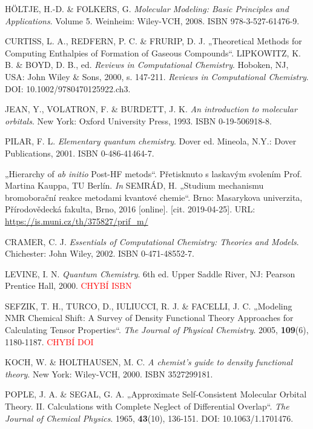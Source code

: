 \begin{thebibliography}{10}
HÖLTJE, H.-D. \& FOLKERS, G. \textit{Molecular Modeling: Basic Principles and Applications}. Volume 5. Weinheim: Wiley-VCH, 2008. ISBN 978-3-527-61476-9.

CURTISS, L. A., REDFERN, P. C. \& FRURIP, D. J. „Theoretical Methods for Computing Enthalpies of Formation of Gaseous Compounds“. LIPKOWITZ, K. B. \& BOYD, D. B., ed. \textit{Reviews in Computational Chemistry}. Hoboken, NJ, USA: John Wiley \& Sons, 2000, s. 147-211. \textit{Reviews in Computational Chemistry}. DOI: 10.1002/9780470125922.ch3.

JEAN, Y., VOLATRON, F. \& BURDETT, J. K. \textit{An introduction to molecular orbitals}. New York: Oxford University Press, 1993. ISBN 0-19-506918-8.

PILAR, F. L. \textit{Elementary quantum chemistry}. Dover ed. Mineola, N.Y.: Dover Publications, 2001. ISBN 0-486-41464-7.

„Hierarchy of \textit{ab initio} Post-HF metods“. Přetisknuto s laskavým svolením Prof. Martina Kauppa, TU Berlín. \textit{In} SEMRÁD, H. „Studium mechanismu bromoborační reakce metodami kvantové chemie“. Brno: Masarykova univerzita, Přírodovědecká fakulta, Brno, 2016 [online]. [cit. 2019-04-25]. URL: \url{https://is.muni.cz/th/375827/prif_m/}

CRAMER, C. J. \textit{Essentials of Computational Chemistry: Theories and Models}. Chichester: John Wiley, 2002. ISBN 0-471-48552-7.

LEVINE, I. N. \textit{Quantum Chemistry}. 6th ed. Upper Saddle River, NJ: Pearson Prentice Hall, 2000. \textcolor{red}{CHYBÍ ISBN}

SEFZIK, T. H., TURCO, D., IULIUCCI, R. J. \& FACELLI, J. C. „Modeling NMR Chemical Shift: A Survey of Density Functional Theory Approaches for Calculating Tensor Properties“. \textit{The Journal of Physical Chemistry}. 2005, \textbf{109}(6), 1180-1187. \textcolor{red}{CHYBÍ DOI}

KOCH, W. \& HOLTHAUSEN, M. C. \textit{A chemist's guide to density functional theory}. New York: Wiley-VCH, 2000. ISBN 3527299181.

POPLE, J. A. \& SEGAL, G. A. „Approximate Self‐Consistent Molecular Orbital Theory. II. Calculations with Complete Neglect of Differential Overlap“. \textit{The Journal of Chemical Physics}. 1965, \textbf{43}(10), 136-151. DOI: 10.1063/1.1701476.


\end{thebibliography}
